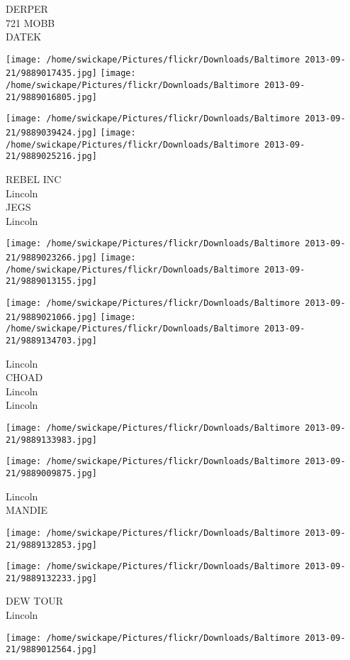 \documentclass[10pt,letterpaper]{article}
\begin{document}
DERPER\\
721 MOBB\\
DATEK
\pagebreak

\texttt{[image: /home/swickape/Pictures/flickr/Downloads/Baltimore 2013-09-21/9889017435.jpg]}
\texttt{[image: /home/swickape/Pictures/flickr/Downloads/Baltimore 2013-09-21/9889016805.jpg]}

\texttt{[image: /home/swickape/Pictures/flickr/Downloads/Baltimore 2013-09-21/9889039424.jpg]}
\texttt{[image: /home/swickape/Pictures/flickr/Downloads/Baltimore 2013-09-21/9889025216.jpg]}

REBEL INC\\
Lincoln\\
JEGS\\
Lincoln
\pagebreak

\texttt{[image: /home/swickape/Pictures/flickr/Downloads/Baltimore 2013-09-21/9889023266.jpg]}
\texttt{[image: /home/swickape/Pictures/flickr/Downloads/Baltimore 2013-09-21/9889013155.jpg]}

\texttt{[image: /home/swickape/Pictures/flickr/Downloads/Baltimore 2013-09-21/9889021066.jpg]}
\texttt{[image: /home/swickape/Pictures/flickr/Downloads/Baltimore 2013-09-21/9889134703.jpg]}

Lincoln\\
CHOAD\\
Lincoln\\
Lincoln
\pagebreak

\texttt{[image: /home/swickape/Pictures/flickr/Downloads/Baltimore 2013-09-21/9889133983.jpg]}

\vspace{0.25in}
\texttt{[image: /home/swickape/Pictures/flickr/Downloads/Baltimore 2013-09-21/9889009875.jpg]}

Lincoln\\
MANDIE
\pagebreak

\texttt{[image: /home/swickape/Pictures/flickr/Downloads/Baltimore 2013-09-21/9889132853.jpg]}

\vspace{0.25in}
\texttt{[image: /home/swickape/Pictures/flickr/Downloads/Baltimore 2013-09-21/9889132233.jpg]}

DEW TOUR\\
Lincoln
\pagebreak

\texttt{[image: /home/swickape/Pictures/flickr/Downloads/Baltimore 2013-09-21/9889012564.jpg]}
\end{document}
